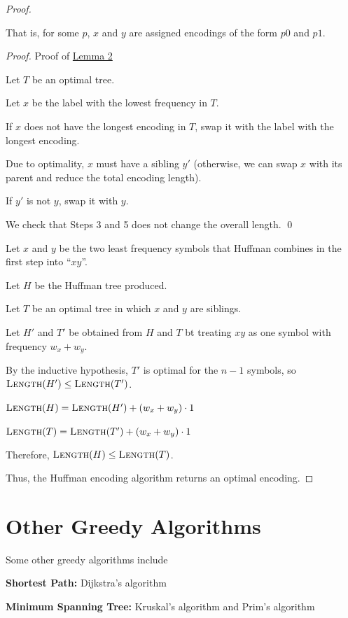 \begin{proof}
\begin{listu}
\begin{lemma*}[2]
            That is, for some $p$, $x$ and $y$ are assigned encodings of the form $p0$ and $p1$.
        \end{lemma*}

        \textit{Proof.}
            Proof of \hyperref[lem:huffman-2]{Lemma 2}

            \begin{listo}
                \item Let $T$ be an optimal tree.
                \item Let $x$ be the label with the lowest frequency in $T$.
                \item If $x$ does not have the longest encoding in $T$, swap it with the label with the longest encoding.
                \item Due to optimality, $x$ must have a sibling $y'$ (otherwise, we can swap $x$ with its parent and reduce the total encoding length).
                \item If $y'$ is not $y$, swap it with $y$.
                \item We check that Steps 3 and 5 does not change the overall length. \qed
            \end{listo}

        Let $x$ and $y$ be the two least frequency symbols that Huffman combines in the first step into ``$xy$''.

        Let $H$ be the Huffman tree produced. 

        Let $T$ be an optimal tree in which $x$ and $y$ are siblings.

        Let $H'$ and $T'$ be obtained from $H$ and $T$ bt treating $xy$ as one symbol with frequency $w_x + w_y$.

        By the inductive hypothesis, $T'$ is optimal for the $n - 1$ symbols, so $\textsc{Length}(H') \le \textsc{Length}(T')$.

        \begin{listu}
            \item $\textsc{Length}(H) = \textsc{Length}(H') + (w_x + w_y) \cdot 1$
            \item $\textsc{Length}(T) = \textsc{Length}(T') + (w_x + w_y) \cdot 1$
        \end{listu}

        Therefore, $\textsc{Length}(H) \le \textsc{Length}(T)$.
    \end{listu}

    Thus, the Huffman encoding algorithm returns an optimal encoding.
\end{proof}

\section{Other Greedy Algorithms}

Some other greedy algorithms include
\begin{listu}
    \item \textbf{Shortest Path:} Dijkstra's algorithm
    \item \textbf{Minimum Spanning Tree:} Kruskal's algorithm and Prim's algorithm
\end{listu}